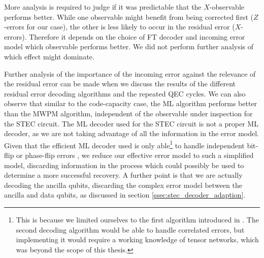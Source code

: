 More analysis is required to judge if it was predictable that the $X$-observable performs better.
While one observable might benefit from being corrected first ($Z$-errors for our case), 
the other is less likely to occur in the residual error ($X$-errors).
Therefore it depends on the choice of FT decoder and incoming error model which observable performs better.
We did not perform further analysis of which effect might dominate.

Further analysis of the importance of the incoming error against the relevance of the residual error can be made when we discuss the results of the different residual error decoding algorithms 
and the repeated QEC cycles.
We can also observe that similar to the code-capacity case, the ML algorithm performs better than the MWPM algorithm, independent of the observable under inspection for the STEC circuit.
The ML decoder used for the STEC circuit is not a proper ML decoder, as we are not taking advantage of all the information in the error model.
Given that the efficient ML decoder used is only able\footnote{
    This is because we limited ourselves to the first algorithm introduced in \cite{efficient_decoding_algorithm}. 
    The second decoding algorithm would be able to handle correlated errors, 
    but implementing it would require a working knowledge of tensor networks, which was beyond the scope of this thesis.
} to handle independent bit-flip or phase-flip errors \cite{efficient_decoding_algorithm}, we reduce our effective error model to such a simplified model, 
discarding information in the process which could possibly be used to determine a more successful recovery. 
A further point is that we are actually decoding the ancilla qubits, discarding the complex error model between the ancilla and data qubits, as discussed in section \ref{ssec:stec_decoder_adaption}.

